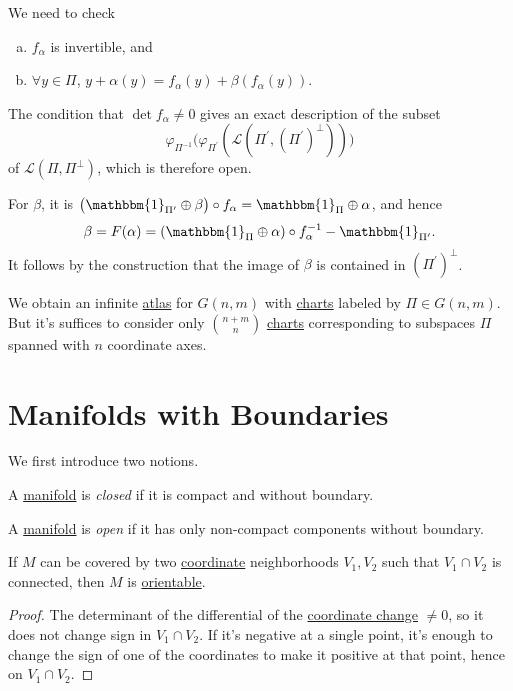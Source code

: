We need to check
\begin{enumerate}[(a)]
	\item \(f_\alpha \) is invertible, and
	\item \(\forall y\in \Pi \), \(y+\alpha (y) = f_\alpha (y) + \beta (f_\alpha (y))\).
\end{enumerate}

\begin{note}
	The condition that \(\det f_\alpha \neq 0\) gives an exact description of the subset
	\[
		\varphi _{\Pi ^{-1} }\big(\varphi _{\Pi ^\prime }(\mathcal{L} (\Pi ^\prime , (\Pi ^\prime )^{\perp} ))\big)
	\]
	of \(\mathcal{L} (\Pi , \Pi ^{\perp} )\), which is therefore open.
\end{note}

For \(\beta \), it is \(\big(\mathbbm{1}_{\Pi ^\prime }\oplus \beta \big) \circ f_\alpha = \mathbbm{1}_{\Pi }\oplus \alpha  \), and hence
\[
	\beta = F(\alpha ) = (\mathbbm{1}_{\Pi }\oplus \alpha  )\circ f_\alpha ^{-1} - \mathbbm{1}_{\Pi ^\prime } .
\]
It follows by the construction that the image of \(\beta \) is contained in \((\Pi ^\prime )^{\perp} \).

\begin{remark}
	We obtain an infinite \hyperref[def:atlas]{atlas} for \(G(n, m)\) with \hyperref[def:coordinate-chart]{charts} labeled by \(\Pi \in G(n, m)\). But it's suffices to consider only \(\binom{n+m}{n}\) \hyperref[def:coordinate-chart]{charts} corresponding to subspaces \(\Pi \) spanned with \(n\) coordinate axes.
\end{remark}

\section{Manifolds with Boundaries}
We first introduce two notions.

\begin{definition}\label{def:closed-manifold}
	A \hyperref[def:topological-manifold]{manifold} is \emph{closed} if it is compact and without boundary.
\end{definition}

\begin{definition}\label{def:open-manifold}
	A \hyperref[def:topological-manifold]{manifold} is \emph{open} if it has only non-compact components without boundary.
\end{definition}

\begin{lemma}
	If \(M\) can be covered by two \hyperref[def:coordinate-chart]{coordinate} neighborhoods \(V_1, V_2\) such that \(V_1 \cap V_2\) is connected, then \(M\) is \hyperref[def:orientable]{orientable}.
\end{lemma}
\begin{proof}
	The determinant of the differential of the \hyperref[def:coordinate-transition]{coordinate change} \(\neq 0\), so it does not change sign in \(V_1 \cap V_2\). If it's negative at a single point, it's enough to change the sign of one of the coordinates to make it positive at that point, hence on \(V_1 \cap V_2\).
\end{proof}

